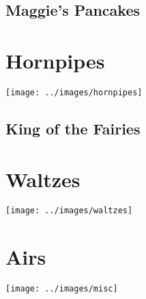 \documentclass[12pt]{report}
\newcommand*{\cleartoleftpage}{%
	\clearpage
	\ifodd\value{page}\hbox{}\newpage\fi
}
\newcommand*{\cleartorightpage}{%
	\clearpage
	\ifodd\value{page}\else\hbox{}\newpage\fi
}
\begin{document}
	\cleartoleftpage
	\section*{Maggie's Pancakes}
	

\cleartorightpage
\chapter*{Hornpipes}
\begin{center}
\texttt{[image: ../images/hornpipes]}
\end{center}

	\cleartoleftpage
	\section*{King of the Fairies}
	

\cleartorightpage
\chapter*{Waltzes}
\begin{center}
\texttt{[image: ../images/waltzes]}
\end{center}

%	


	\cleartoleftpage
	

\cleartorightpage
\chapter*{Airs}
\begin{center}
\texttt{[image: ../images/misc]}
\end{center}


	\cleartoleftpage
	

\end{document}
